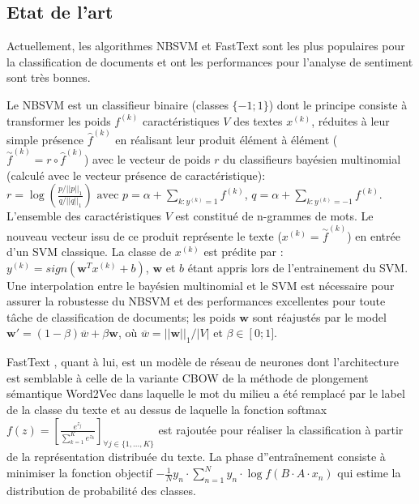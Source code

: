 \subsection{Etat de l'art}
Actuellement, les algorithmes NBSVM et FastText sont les plus populaires pour la classification de documents et ont les performances pour l'analyse de sentiment sont très bonnes. 

Le NBSVM \citep{wang2012nbsvm} est un classifieur binaire (classes $\lbrace -1; 1 \rbrace$) dont le principe consiste à transformer les poids $f^{(k)}$ caractéristiques $V$ des textes $x^{(k)}$, réduites à leur simple présence $\widehat{f}^{(k)}$ en réalisant leur produit élément à élément ($\overset{\sim}{f}^{(k)} = {r} \circ \widehat{f}^{(k)}$) avec le vecteur de poids $r$ du classifieurs bayésien multinomial (calculé avec le vecteur présence de caractéristique):
$r = \log \left( \frac{p/\vert\vert p \vert\vert_1}{q / \vert\vert q \vert\vert_1}\right)
\text{ avec } p=\alpha + \sum\limits_{k:y^{(k)}=1}{f}^{(k)}$, $q=\alpha + \sum\limits_{k:y^{(k)}=-1}{f}^{(k)}$. L'ensemble des caractéristiques $V$ est constitué de n-grammes de mots. Le nouveau vecteur issu de ce produit représente le texte ($x^{(k)} = \overset{\sim}{f}^{(k)}$) en entrée d'un SVM classique. La classe de $x^{(k)}$ est prédite par : $y^{(k)} = sign(\mathbf{w}^Tx^{(k)} + b)$, $\mathbf{w}$ et $b$ étant appris lors de l'entrainement du SVM. Une interpolation  entre le bayésien multinomial et le SVM est nécessaire pour assurer la robustesse du NBSVM et des performances excellentes pour toute tâche de classification de documents; les poids $\mathbf{w}$ sont réajustés par le model $\mathbf{w'} = (1 - \beta) \overline{w} + \beta \mathbf{w}$, où $\overline{w} = \vert\vert \mathbf{w}\vert\vert_1 / \vert V \vert$ et $\beta \in \left[0; 1] \right.$. 
  
 FastText \citep{grave2017fasttextcls}, quant à lui, est un modèle de réseau de neurones dont l'architecture est semblable à celle de la variante CBOW de la méthode de plongement sémantique Word2Vec dans laquelle le mot du milieu a été remplacé par le label de la classe du texte et au dessus de laquelle la fonction softmax $f(z) = \left[ \frac{e^{z_j}}{\sum\limits_{k=1}^K e^{z_k}} \right]_{\forall j \in \lbrace 1, ..., K \rbrace} $ est rajoutée pour réaliser la classification à partir de la représentation distribuée du texte. La phase d''entraînement consiste à minimiser la fonction objectif $-\frac{1}{N}y_n \cdot \sum\limits_{n=1}^N y_n \cdot \log{f(B\cdot A\cdot x_n)}$ qui estime la distribution de probabilité des classes.

